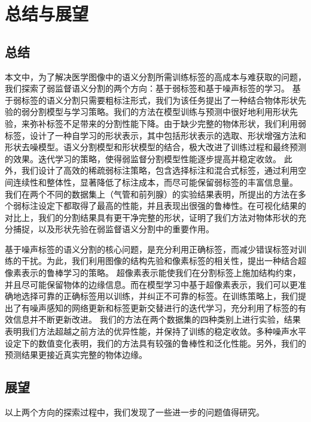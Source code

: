 \chapter{总结与展望}

\section{总结}
本文中，为了解决医学图像中的语义分割所需训练标签的高成本与难获取的问题，我们探索了弱监督语义分割的两个方向：基于弱标签和基于噪声标签的学习。
基于弱标签的语义分割只需要粗标注形式，我们为该任务提出了一种结合物体形状先验的弱分割模型与学习策略。我们的方法在模型训练与预测中很好地利用形状先验，来弥补标签不足带来的分割性能下降。由于缺少完整的物体形状，我们利用弱标签，设计了一种自学习的形状表示，其中包括形状表示的选取、形状增强方法和形状去噪模型。语义分割模型和形状模型的结合，极大改进了训练过程和最终预测的效果。迭代学习的策略，使得弱监督分割模型性能逐步提高并稳定收敛。
此外，我们设计了高效的稀疏弱标注策略，包含选择标注和混合式标签，通过利用空间连续性和整体性，显著降低了标注成本，而尽可能保留弱标签的丰富信息量。
我们在两个不同的数据集上（气管和前列腺）的实验结果表明，所提出的方法在多个弱标注设定下都取得了最高的性能，并且表现出很强的鲁棒性。在可视化结果的对比上，我们的分割结果具有更干净完整的形状，证明了我们方法对物体形状的充分捕捉，以及形状先验在弱监督语义分割中的重要作用。

基于噪声标签的语义分割的核心问题，是充分利用正确标签，而减少错误标签对训练的干扰。为此，我们利用图像的结构先验和像素标签的相关性，提出一种结合超像素表示的鲁棒学习的策略。
超像素表示能使我们在分割标签上施加结构约束，并且尽可能保留物体的边缘信息。而在模型学习中基于超像素表示，我们可以更准确地选择可靠的正确标签用以训练，并纠正不可靠的标签。在训练策略上，我们提出了有噪声感知的网络更新和标签更新交替进行的迭代学习，充分利用了标签的有效信息并不断更新改进。
我们的方法在两个数据集的四种类别上进行实验，结果表明我们方法超越之前方法的优异性能，并保持了训练的稳定收敛。多种噪声水平设定下的数值变化表明，我们的方法具有较强的鲁棒性和泛化性能。另外，我们的预测结果更接近真实完整的物体边缘。

\section{展望}
以上两个方向的探索过程中，我们发现了一些进一步的问题值得研究。

